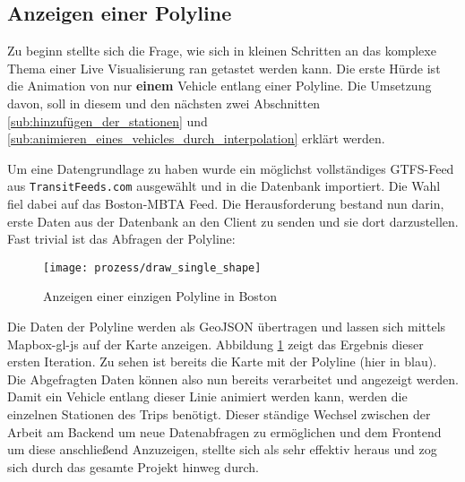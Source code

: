 \subsection{Anzeigen einer Polyline}
\label{sub:anzeigen_einer_polyline}
  Zu beginn stellte sich die Frage, wie sich in kleinen Schritten an das komplexe Thema einer Live Visualisierung ran getastet werden kann. Die erste Hürde ist die Animation von nur \textbf{einem} Vehicle entlang einer Polyline. Die Umsetzung davon, soll in diesem und den nächsten zwei Abschnitten \ref{sub:hinzufügen_der_stationen} und \ref{sub:animieren_eines_vehicles_durch_interpolation} erklärt werden.

  Um eine Datengrundlage zu haben wurde ein möglichst vollständiges GTFS-Feed aus \texttt{TransitFeeds.com} ausgewählt und in die Datenbank importiert. Die Wahl fiel dabei auf das Boston-MBTA Feed. Die Herausforderung bestand nun darin, erste Daten aus der Datenbank an den Client zu senden und sie dort darzustellen. Fast trivial ist das Abfragen der Polyline: \colorbox{lightGrey}{\texttt{}}

  \begin{figure}[htbp]
    \begin{center}
      \texttt{[image: prozess/draw\_single\_shape]}
      \caption{Anzeigen einer einzigen Polyline in Boston}
      \label{fig:prozess/draw_single_shape}
    \end{center}
  \end{figure}
  
  Die Daten der Polyline werden als GeoJSON übertragen und lassen sich mittels Mapbox-gl-js auf der Karte anzeigen. Abbildung \ref{fig:prozess/draw_single_shape} zeigt das Ergebnis dieser ersten Iteration. Zu sehen ist bereits die Karte mit der Polyline (hier in blau). Die Abgefragten Daten können also nun bereits verarbeitet und angezeigt werden. Damit ein Vehicle entlang dieser Linie animiert werden kann, werden die einzelnen Stationen des Trips benötigt.
  Dieser ständige Wechsel zwischen der Arbeit am Backend um neue Datenabfragen zu ermöglichen und dem Frontend um diese anschließend Anzuzeigen, stellte sich als sehr effektiv heraus und zog sich durch das gesamte Projekt hinweg durch.
